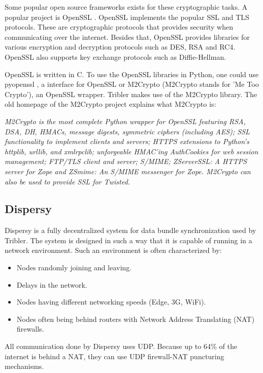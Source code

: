 		Some popular open source frameworks exists for these cryptographic tasks. A popular project is OpenSSL \cite{openssl}. OpenSSL implements the popular SSL and TLS protocols. These are cryptographic protocols that provides security when communicating over the internet. Besides that, OpenSSL provides libraries for various encryption and decryption protocols such as DES, RSA and RC4. OpenSSL also supports key exchange protocols such as Diffie-Hellman.
		
		OpenSSL is written in C. To use the OpenSSL libraries in Python, one could use pyopenssl \cite{pyopensslgithub}, a interface for OpenSSL or M2Crypto \cite{m2cryptogithub} (M2Crypto stands for 'Me Too Crypto'), an OpenSSL wrapper. Tribler makes use of the M2Crypto library. The old homepage of the M2Crypto project \cite{m2crypto} explains what M2Crypto is:
		
		\emph{M2Crypto is the most complete Python wrapper for OpenSSL featuring RSA, DSA, DH, HMACs, message digests, symmetric ciphers (including AES); SSL functionality to implement clients and servers; HTTPS extensions to Python's httplib, urllib, and xmlrpclib; unforgeable HMAC'ing AuthCookies for web session management; FTP/TLS client and server; S/MIME; ZServerSSL: A HTTPS server for Zope and ZSmime: An S/MIME messenger for Zope. M2Crypto can also be used to provide SSL for Twisted.}
		
	\subsection{Dispersy}
		Dispersy \cite{zeilemaker2013dispersy} is a fully decentralized system for data bundle synchronization used by Tribler. The system is designed in such a way that it is capable of running in a network environment. Such an environment is often characterized by:
		\begin{itemize}
			\item Nodes randomly joining and leaving.
			\item Delays in the network.
			\item Nodes having different networking speeds (Edge, 3G, WiFi).
			\item Nodes often being behind routers with Network Address Translating (NAT) firewalls.
		\end{itemize}
		
		All communication done by Dispersy uses UDP. Because up to 64\% of the internet is behind a NAT, they can use UDP firewall-NAT puncturing mechanisms.
		
